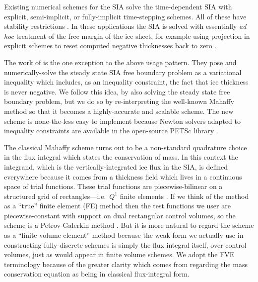 \documentclass[twocolumn,letterpaper]{igs}
\begin{document}
Existing numerical schemes for the SIA solve the time-dependent SIA with explicit, semi-implicit, or fully-implicit time-stepping schemes.  All of these have stability restrictions \citep[among others]{Bueleretal2005,EgholmNielsen2010,HindmarshPayne1996,Huybrechtsetal1996,
JaroschSchoofAnslow2013}.  In these applications the SIA is solved with essentially \emph{ad hoc} treatment of the free margin of the ice sheet, for example using projection in explicit schemes to reset computed negative thicknesses back to zero \citep{Bueleretal2005,JaroschSchoofAnslow2013}.

The work of \cite{JouvetBueler2012} is the one exception to the above usage pattern.  They pose and numerically-solve the steady state SIA free boundary problem as a variational inequality \citep{KinderlehrerStampacchia1980} which includes, as an inequality constraint, the fact that ice thickness is never negative.  We follow this idea, by also solving the steady state free boundary problem, but we do so by re-interpreting the well-known Mahaffy method so that it becomes a highly-accurate and scalable scheme.  The new scheme is none-the-less easy to implement because Newton solvers adapted to inequality constraints \citep{BensonMunson2006} are available in the open-source PETSc library \citep{Balayetal2014}.

The classical Mahaffy scheme turns out to be a non-standard quadrature choice in the flux integral which states the conservation of mass.  In this context the integrand, which is the vertically-integrated ice flux in the SIA, is defined everywhere because it comes from a thickness field which lives in a continuous space of trial functions.  These trial functions are piecewise-bilinear on a structured grid of rectangles---i.e.~$Q^1$ finite elements \citep{Elmanetal2005}.  If we think of the method as a ``true'' finite element (FE) method then the test functions we user are piecewise-constant with support on dual rectangular control volumes, so the scheme is a Petrov-Galerkin method \citep{Elmanetal2005}.  But it is more natural to regard the scheme as a ``finite volume element'' \citep[FVE;][]{Cai1990,EwingLinLin2002} method because the weak form we actually use in constructing fully-discrete schemes is simply the flux integral itself, over control volumes, just as would appear in finite volume \citep[FV;][]{LeVeque2002} schemes.  We adopt the FVE terminology because of the greater clarity which comes from regarding the mass conservation equation as being in classical flux-integral form.
\end{document}

